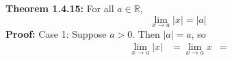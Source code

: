 \documentclass{article}
\begin{document}
	\textbf{Theorem 1.4.15:} For all $a \in \mathbb{R}$,
	$$\lim_{x \to a}{|x|} = |a|$$
	\textbf{Proof:}
	Case 1: Suppose $a > 0$. Then $|a| = a$, so
	\begin{align*}
		\lim_{x \to a}{|x|} &= \lim_{x \to a}{x}
		                    &= 
	\end{align*}
\end{document}
